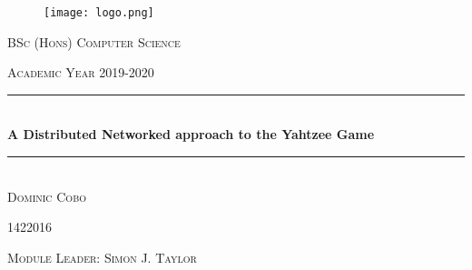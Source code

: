 \documentclass[a4paper, 10pt]{article}
\newcommand{\fypCourse}{BSc (Hons) Computer Science}
\newcommand{\fypStudent}{Dominic Cobo}
\newcommand{\fypStudentId}{1422016}
\newcommand{\moduleLeader}{Simon J. Taylor}
\newcommand{\fypAcademicYear}{2019-2020}
\newcommand{\fypTitle}{A Distributed Networked approach to the Yahtzee Game}
\begin{document}
	\begin{titlepage}
		\centering
		\begin{figure}
			\texttt{[image: logo.png]}
		\end{figure}
		\textsc{\LARGE \fypCourse}
		
		\textsc{\large Academic Year \fypAcademicYear}
		
		\rule{\linewidth}{0.5mm} \\[0.5cm]
		{ \huge\textbf { \fypTitle } } \\
		\rule{\linewidth}{0.5mm} \\[6cm]
		
		
		\textsc{\huge \fypStudent}
		
		\textsc{\large \fypStudentId}
		
		\bigskip
		
		\textsc{\large Module Leader: \moduleLeader}
		
		\bigskip
		
	\end{titlepage}
	
	\newpage
	
	
	
	
	
	

	\printbibliography
	
\end{document}
